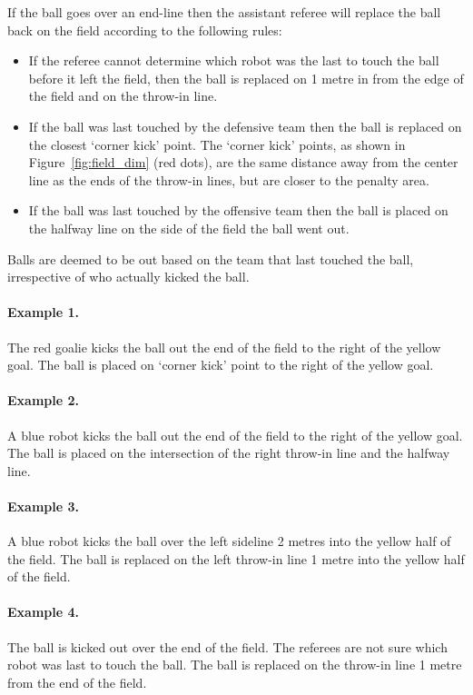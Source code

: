 \documentclass[12pt]{article}
\begin{document}
If the ball goes over an end-line then the assistant referee will
replace the ball back on the field according to the following rules:
\begin{itemize}
\item If the referee cannot determine which robot was the last to
  touch the ball before it left the field, then the ball is replaced
  on 1 metre in from the edge of the field and on the throw-in line.
\item If the ball was last touched by the defensive team then the ball
  is replaced on the closest `corner kick' point. The `corner kick'
  points, as shown in Figure~\ref{fig:field_dim} (red dots), are the
  same distance away from the center line as the ends of the throw-in
  lines, but are closer to the penalty area.
\item If the ball was last touched by the offensive team then the ball
  is placed on the halfway line on the side of the field the ball went
  out.
\end{itemize}

Balls are deemed to be out based on the team that last touched the
ball, irrespective of who actually kicked the ball.

\paragraph{Example 1.} The red goalie kicks the ball out the end of the
field to the right of the yellow goal.  The ball is placed on `corner kick' point
to the right of the yellow goal.

\paragraph{Example 2.} A blue robot kicks the ball out the end of the
field to the right of the yellow goal. The ball is placed on the intersection
of the right throw-in line and the halfway line.

\paragraph{Example 3.} A blue robot kicks the ball over the left
sideline 2 metres into the yellow half of the field. The ball is
replaced on the left throw-in line 1 metre into the yellow half of the field.

\paragraph{Example 4.} The ball is kicked out over the end of the field.  The
referees are not sure which robot was last to touch the ball.  The ball is
replaced on the throw-in line 1 metre from the end of the field.
\end{document}

